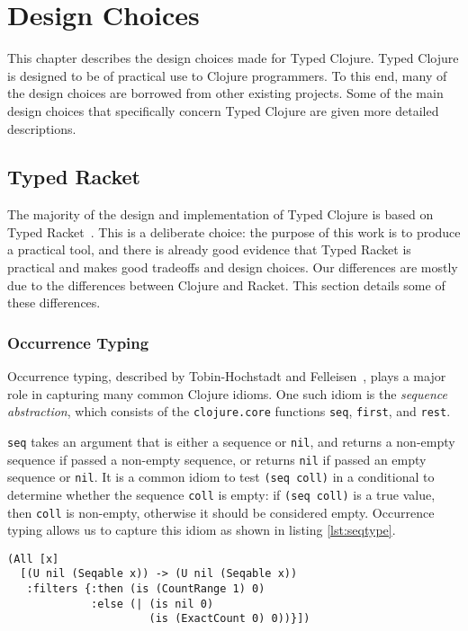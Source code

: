 \chapter{Design Choices}

This chapter describes the design choices made for Typed Clojure.
Typed Clojure is designed to be of practical use to Clojure programmers.
To this end, many of the design choices are borrowed from other existing projects.
Some of the main design choices that specifically concern Typed Clojure are given
more detailed descriptions.

\section{Typed Racket}

The majority of the design and implementation of Typed Clojure is based on Typed Racket~\cite{Tob10}.
This is a deliberate choice: the purpose of this work is to produce
a practical tool, and there is already good evidence that Typed Racket
is practical and makes good tradeoffs and design choices.
Our differences are mostly due to the differences between Clojure and Racket.
This section details some of these differences.

\subsection{Occurrence Typing}

Occurrence typing, described by Tobin-Hochstadt and Felleisen~\cite{TF10},
plays a major role in capturing many common Clojure idioms.
One such idiom is the \emph{sequence abstraction}, which
consists of the \lstinline|clojure.core| functions \lstinline|seq|, \lstinline|first|, and \lstinline|rest|.

\lstinline|seq| takes an argument that is either a sequence or \lstinline|nil|,
and returns a non-empty sequence if passed a non-empty sequence, or returns
\lstinline|nil| if passed an empty sequence or \lstinline|nil|.
It is a common idiom to test \lstinline|(seq coll)| in a conditional
to determine whether the sequence \lstinline|coll| is empty:
if \lstinline|(seq coll)| is a true value, then \lstinline|coll|
is non-empty, otherwise it should be considered empty.
Occurrence typing allows us to capture this idiom as shown in
listing \ref{lst:seqtype}.

\begin{lstlisting}[caption=Type associated with clojure.core/seq, label=lst:seqtype]
(All [x]
  [(U nil (Seqable x)) -> (U nil (Seqable x))
   :filters {:then (is (CountRange 1) 0)
             :else (| (is nil 0)
                      (is (ExactCount 0) 0))}])
\end{lstlisting}

